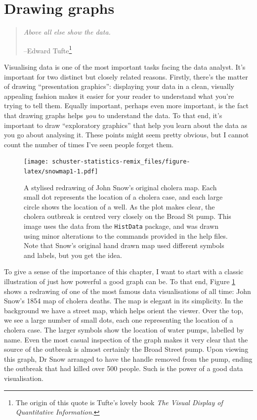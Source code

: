 \documentclass[
]{book}
\begin{document}
\hypertarget{graphics}{%
\section{Drawing graphs}\label{graphics}}

\begin{quote}
\emph{Above all else show the data.}

--Edward Tufte\footnote{The origin of this quote is Tufte's lovely book \emph{The Visual Display of Quantitative Information}.}
\end{quote}

Visualising data is one of the most important tasks facing the data analyst. It's important for two distinct but closely related reasons. Firstly, there's the matter of drawing ``presentation graphics'': displaying your data in a clean, visually appealing fashion makes it easier for your reader to understand what you're trying to tell them. Equally important, perhaps even more important, is the fact that drawing graphs helps \emph{you} to understand the data. To that end, it's important to draw ``exploratory graphics'' that help you learn about the data as you go about analysing it. These points might seem pretty obvious, but I cannot count the number of times I've seen people forget them.

\begin{figure}
\centering
\texttt{[image: schuster-statistics-remix\_files/figure-latex/snowmap1-1.pdf]}
\caption{\label{fig:snowmap1}A stylised redrawing of John Snow's original cholera map. Each small dot represents the location of a cholera case, and each large circle shows the location of a well. As the plot makes clear, the cholera outbreak is centred very closely on the Broad St pump. This image uses the data from the \texttt{HistData} package, and was drawn using minor alterations to the commands provided in the help files. Note that Snow's original hand drawn map used different symbols and labels, but you get the idea.}
\end{figure}

To give a sense of the importance of this chapter, I want to start with a classic illustration of just how powerful a good graph can be. To that end, Figure \ref{fig:snowmap1} shows a redrawing of one of the most famous data visualisations of all time: John Snow's 1854 map of cholera deaths. The map is elegant in its simplicity. In the background we have a street map, which helps orient the viewer. Over the top, we see a large number of small dots, each one representing the location of a cholera case. The larger symbols show the location of water pumps, labelled by name. Even the most casual inspection of the graph makes it very clear that the source of the outbreak is almost certainly the Broad Street pump. Upon viewing this graph, Dr Snow arranged to have the handle removed from the pump, ending the outbreak that had killed over 500 people. Such is the power of a good data visualisation.
\end{document}
